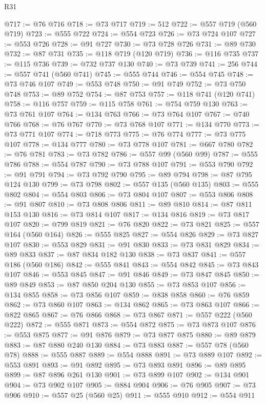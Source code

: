\begin{lexlean}{R31}
\begin{coremodule}
@717 := @76 @716
@718 := @73 @717
@719 := 512
@722 := @557 @719 (@560 @719)
@723 := @555 @722
@724 := @554 @723
@726 := @73 @724 @107
@727 := @553 @726
@728 := @91 @727
@730 := @73 @728 @726
@731 := @89 @730
@732 := @87 @731
@735 := @118 @719 (@120 @719)
@736 := @116 @735
@737 := @115 @736
@739 := @732 @737 @130
@740 := @73 @739
@741 := 256
@744 := @557 @741 (@560 @741)
@745 := @555 @744
@746 := @554 @745
@748 := @73 @746 @107
@749 := @553 @748
@750 := @91 @749
@752 := @73 @750 @748
@753 := @89 @752
@754 := @87 @753
@757 := @118 @741 (@120 @741)
@758 := @116 @757
@759 := @115 @758
@761 := @754 @759 @130
@763 := @73 @761 @107
@764 := @134 @763
@766 := @73 @764 @107
@767 := @740 @766
@768 := @76 @767
@770 := @73 @768 @107
@771 := @134 @770
@773 := @73 @771 @107
@774 := @718 @773
@775 := @76 @774
@777 := @73 @775 @107
@778 := @134 @777
@780 := @73 @778 @107
@781 := @667 @780
@782 := @76 @781
@783 := @73 @782
@786 := @557 @99 (@560 @99)
@787 := @555 @786
@788 := @554 @787
@790 := @73 @788 @107
@791 := @553 @790
@792 := @91 @791
@794 := @73 @792 @790
@795 := @89 @794
@798 := @87 @795 @124 @130
@799 := @73 @798
@802 := @557 @135 (@560 @135)
@803 := @555 @802
@804 := @554 @803
@806 := @73 @804 @107
@807 := @553 @806
@808 := @91 @807
@810 := @73 @808 @806
@811 := @89 @810
@814 := @87 @811 @153 @130
@816 := @73 @814 @107
@817 := @134 @816
@819 := @73 @817 @107
@820 := @799 @819
@821 := @76 @820
@822 := @73 @821
@825 := @557 @164 (@560 @164)
@826 := @555 @825
@827 := @554 @826
@829 := @73 @827 @107
@830 := @553 @829
@831 := @91 @830
@833 := @73 @831 @829
@834 := @89 @833
@837 := @87 @834 @182 @130
@838 := @73 @837
@841 := @557 @186 (@560 @186)
@842 := @555 @841
@843 := @554 @842
@845 := @73 @843 @107
@846 := @553 @845
@847 := @91 @846
@849 := @73 @847 @845
@850 := @89 @849
@853 := @87 @850 @204 @130
@855 := @73 @853 @107
@856 := @134 @855
@858 := @73 @856 @107
@859 := @838 @858
@860 := @76 @859
@862 := @73 @860 @107
@863 := @134 @862
@865 := @73 @863 @107
@866 := @822 @865
@867 := @76 @866
@868 := @73 @867
@871 := @557 @222 (@560 @222)
@872 := @555 @871
@873 := @554 @872
@875 := @73 @873 @107
@876 := @553 @875
@877 := @91 @876
@879 := @73 @877 @875
@880 := @89 @879
@883 := @87 @880 @240 @130
@884 := @73 @883
@887 := @557 @78 (@560 @78)
@888 := @555 @887
@889 := @554 @888
@891 := @73 @889 @107
@892 := @553 @891
@893 := @91 @892
@895 := @73 @893 @891
@896 := @89 @895
@899 := @87 @896 @261 @130
@901 := @73 @899 @107
@902 := @134 @901
@904 := @73 @902 @107
@905 := @884 @904
@906 := @76 @905
@907 := @73 @906
@910 := @557 @25 (@560 @25)
@911 := @555 @910
@912 := @554 @911

\end{coremodule}
\end{lexlean}
